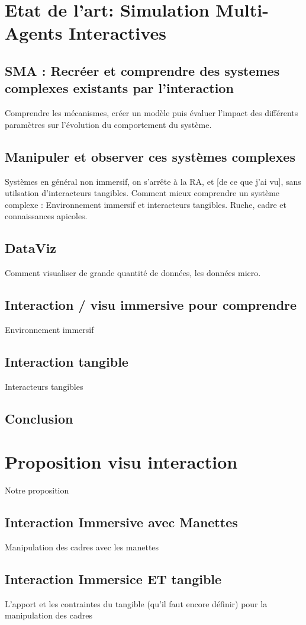 \documentclass[11pt,a4paper]{report}
\begin{document}
\chapter{Etat de l'art: Simulation Multi-Agents Interactives}
	\section{SMA : Recréer et comprendre des systemes complexes existants par l'interaction}
		Comprendre les mécanismes, créer un modèle puis évaluer l'impact des différents paramètres sur l'évolution du comportement du système.
	\section{Manipuler et observer ces systèmes complexes}
		Systèmes en général non immersif, on s'arrête à la RA, et [de ce que j'ai vu], sans utilsation d'interacteurs tangibles.
	Comment mieux comprendre un système complexe : Environnement immersif et interacteurs tangibles. Ruche, cadre et connaissances apicoles.
	\section{DataViz}
		Comment visualiser de grande quantité de données, les données micro.
	\section{Interaction / visu immersive pour comprendre}
		Environnement immersif
	\section{Interaction tangible}
		Interacteurs tangibles
		
			
	\section*{Conclusion}
		
		
		
		
\chapter{Proposition visu interaction}
	Notre proposition
	\section{Interaction Immersive avec Manettes}
		Manipulation des cadres avec les manettes
	\section{Interaction Immersice ET tangible}
		L'apport et les contraintes du tangible (qu'il faut encore définir) pour la manipulation des cadres
\end{document}
